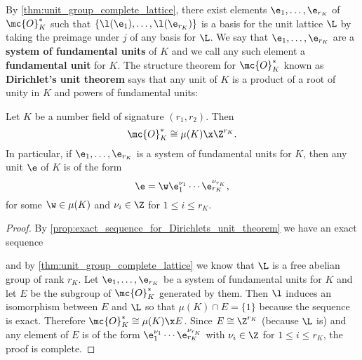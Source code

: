       By \cref{thm:unit_group_complete_lattice}, there exist elements $\e_{1},\ldots,\e_{r_{K}}$ of $\mc{O}_{K}^{\ast}$ such that $\{\l(\e_{1}),\ldots,\l(\e_{r_{K}})\}$ is a basis for the unit lattice $\L$ by taking the preimage under $j$ of any basis for $\L$. We say that $\e_{1},\ldots,\e_{r_{K}}$ are a \textbf{system of fundamental units} of $K$ and we call any such element a \textbf{fundamental unit} for $K$. The structure theorem for $\mc{O}_{K}^{\ast}$ known as \textbf{Dirichlet's unit theorem} says that any unit of $K$ is a product of a root of unity in $K$ and powers of fundamental units:

      \begin{theorem}
        Let $K$ be a number field of signature $(r_{1},r_{2})$. Then
        \[
          \mc{O}_{K}^{\ast} \cong \mu(K) \x \Z^{r_{K}}.
        \]
        In particular, if $\e_{1},\ldots,\e_{r_{K}}$ is a system of fundamental units for $K$, then any unit $\e$ of $K$ is of the form
        \[
          \e = \w\e_{1}^{\nu_{1}} \cdots \e_{r_{K}}^{\nu_{r_{K}}},
        \]
        for some $\w \in \mu(K)$ and $\nu_{i} \in \Z$ for $1 \le i \le r_{K}$.
      \end{theorem}
      \begin{proof}
        By \cref{prop:exact_sequence_for_Dirichlets_unit_theorem} we have an exact sequence

        \begin{center}
        \end{center}

        and by \cref{thm:unit_group_complete_lattice} we know that $\L$ is a free abelian group of rank $r_{K}$. Let $\e_{1},\ldots,\e_{r_{K}}$ be a system of fundamental units for $K$ and let $E$ be the subgroup of $\mc{O}_{K}^{\ast}$ generated by them. Then $\l$ induces an isomorphism between $E$ and $\L$ so that $\mu(K) \cap E = \{1\}$ because the sequence is exact. Therefore $\mc{O}_{K}^{\ast} \cong \mu(K) \x E$. Since $E \cong \Z^{r_{K}}$ (because $\L$ is) and any element of $E$ is of the form $\e_{1}^{\nu_{1}} \cdots \e_{r_{K}}^{\nu_{r_{K}}}$ with $\nu_{i} \in \Z$ for $1 \le i \le r_{K}$, the proof is complete.
      \end{proof}

